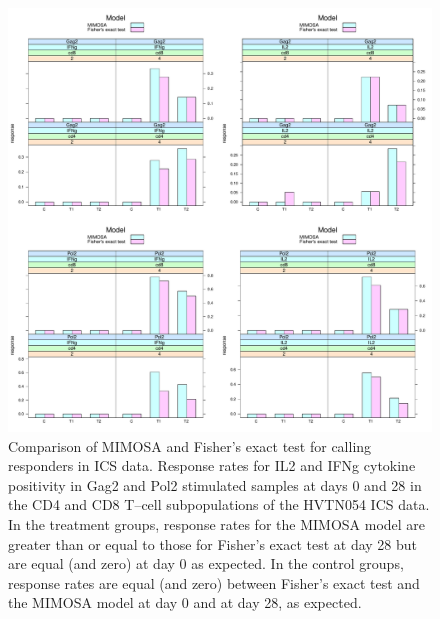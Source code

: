 \documentclass[11pt]{article}
\begin{document}
\begin{figure}[htbp] %
   \centering
   \includegraphics[width=6in]{Figures/PositivityRates} 
   \caption{Comparison of MIMOSA and Fisher's exact test for calling responders in ICS data. Response rates for IL2 and IFNg cytokine positivity in Gag2 and Pol2 stimulated samples at days 0 and 28 in the CD4 and CD8 T--cell subpopulations of the HVTN054 ICS data. In the treatment groups, response rates for the MIMOSA model are greater than or equal to those for Fisher's exact test at day 28 but are equal (and zero) at day 0 as expected. In the control groups, response rates are equal (and zero) between Fisher's exact test and the MIMOSA model at day 0 and at day 28, as expected.}
   \label{fig:positivityrates}
\end{figure}
\end{document}
